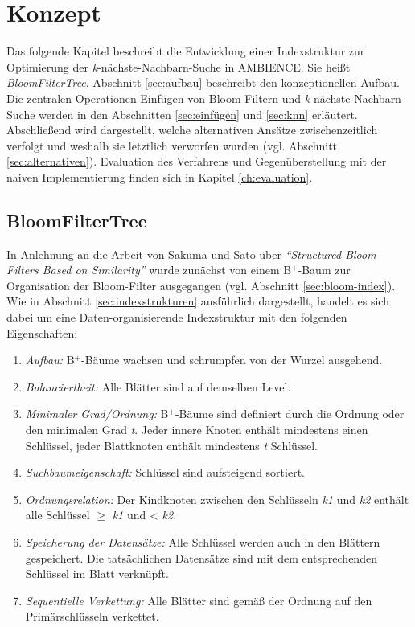 \chapter{Konzept}\label{ch:implementierung}
Das folgende Kapitel beschreibt die Entwicklung einer Indexstruktur zur Optimierung der \textit{k}-nächste-Nachbarn-Suche in AMBIENCE. Sie heißt \textit{BloomFilterTree}. Abschnitt \ref{sec:aufbau} beschreibt den konzeptionellen Aufbau. Die zentralen Operationen Einfügen von Bloom-Filtern und \textit{k}-nächste-Nachbarn-Suche werden in den Abschnitten \ref{sec:einfügen} und \ref{sec:knn} erläutert. Abschließend wird dargestellt, welche alternativen Ansätze zwischenzeitlich verfolgt und weshalb sie letztlich verworfen wurden (vgl. Abschnitt \ref{sec:alternativen}). Evaluation des Verfahrens und Gegenüberstellung mit der naiven Implementierung finden sich in Kapitel \ref{ch:evaluation}.  
\section{BloomFilterTree}\label{sec:bloom-filter-tree}
In Anlehnung an die Arbeit von Sakuma und Sato über \textit{"`Structured Bloom Filters Based on Similarity"'} \cite{Sakuma2011} wurde zunächst von einem B$^+$-Baum zur Organisation der Bloom-Filter ausgegangen (vgl. Abschnitt \ref{sec:bloom-index}). Wie in Abschnitt \ref{sec:indexstrukturen} ausführlich dargestellt, handelt es sich dabei um eine Daten-organisierende Indexstruktur mit den folgenden Eigenschaften: 
\begin{enumerate}
	\setlength{\itemsep}{20pt}
	\item \textit{Aufbau:} B$^+$-Bäume wachsen und schrumpfen von der Wurzel ausgehend.
	\item \textit{Balanciertheit:} Alle Blätter sind auf demselben Level. 
	\item \textit{Minimaler Grad/Ordnung:} B$^+$-Bäume sind definiert durch die Ordnung oder den minimalen Grad \textit{t}. Jeder innere Knoten enthält mindestens einen Schlüssel, jeder Blattknoten enthält mindestens \textit{t} Schlüssel. 
	\item \textit{Suchbaumeigenschaft:} Schlüssel sind aufsteigend sortiert.
	\item \textit{Ordnungsrelation:} Der Kindknoten zwischen den Schlüsseln \textit{k1} und \textit{k2} enthält alle Schlüssel $\geq$ \textit{k1} und < \textit{k2}.
	\item \textit{Speicherung der Datensätze:} Alle Schlüssel werden auch in den Blättern gespeichert. Die tatsächlichen Datensätze sind mit dem entsprechenden Schlüssel im Blatt verknüpft. 
	\item \textit{Sequentielle Verkettung:} Alle Blätter sind gemäß der Ordnung auf den Primärschlüsseln verkettet. 
\end{enumerate} 
